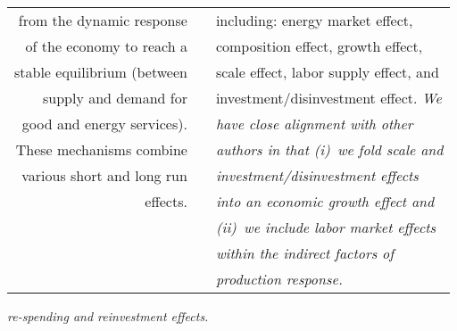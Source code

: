 \begin{table}
\begin{center}
\begin{tabular}{ r l l }
from the dynamic response          &                                              & including: energy market effect, \\
of the economy to reach a          &                                              & composition effect, growth effect, \\
stable equilibrium (between        &                                              & scale effect, labor supply effect, and \\
supply and demand for              &                                              & investment/disinvestment effect. \emph{We} \\
good and energy services).         &                                              & \emph{have close alignment with other} \\
These mechanisms combine           &                                              & \emph{authors in that (i)~we fold scale and} \\
various short and long run         &                                              & \emph{investment/disinvestment effects} \\
effects.                           &                                              & \emph{into an economic growth effect and} \\
                                   &                                              & \emph{(ii)~we include labor market effects } \\ 
                                   &                                              & \emph{within the indirect factors of } \\
                                   &                                              & \emph{production response.} \\
\bottomrule
\end{tabular}
\end{center}
\end{table}



\emph{re-spending and reinvestment effects.}